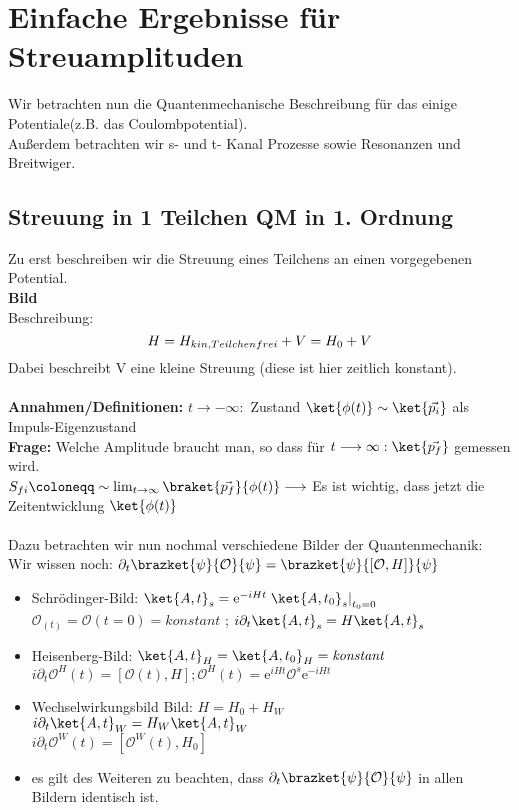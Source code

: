 \chapter{Einfache Ergebnisse für Streuamplituden}

Wir betrachten nun die Quantenmechanische Beschreibung für das einige 
Potentiale(z.B. das Coulombpotential). \\
Außerdem betrachten wir s- und t- Kanal Prozesse sowie Resonanzen und 
Breitwiger.  

\section{Streuung in 1 Teilchen QM in 1. Ordnung}

Zu erst beschreiben wir die Streuung eines Teilchens an einen vorgegebenen 
Potential. \\
\textbf{Bild} \\
Beschreibung: \[ H= H_{kin, Teilchenfrei} + V \\
= H_0 + V  \]
Dabei beschreibt V eine kleine Streuung (diese ist hier zeitlich konstant). \\
\\
\textbf{Annahmen/Definitionen:} $t \longrightarrow - \infty:$ Zustand 
$\ket{\phi(t)} \sim \ket{\vec{p_i}}$ als Impuls-Eigenzustand\\
\textbf{Frage:} Welche Amplitude braucht man, so dass für $t \longrightarrow 
\infty: \ket{\vec{p_f}}$ gemessen wird. \\
$S_{fi} \coloneqq \sim \lim_{t\to \infty} \braket{\vec{p_f}}{\phi(t)} 
\longrightarrow$ Es ist wichtig, dass jetzt die Zeitentwicklung $\ket{\phi(t)}$ 
\\
\\
Dazu betrachten wir nun nochmal verschiedene Bilder der Quantenmechanik: \\
Wir wissen noch: $\partial_t \brazket{\psi}{\mathcal{O}}{\psi} = 
\brazket{\psi}{ \left[ \mathcal{O},H \right] }{\psi}$
\begin{itemize}
	\item Schrödinger-Bild: $\ket{A,t}_s = \mathrm{e}^{-iHt} \left. 
	\ket{A,t_0}_s \right|_{t_0 = 0}$
	$\mathcal{O}_(t) = \mathcal{O}(t=0) = \mathit{konstant}$ ; $i\partial_t 
	\ket{A,t}_s = H \ket{A,t}_s$
	\item Heisenberg-Bild: $\ket{A,t}_H = \ket{A,t_0}_H = \mathit{konstant}$ \\
	$i\partial_t \mathcal{O}^H(t) = \left[ \mathcal{O}(t), H \right] ; 
	\mathcal{O}^H(t) = \mathrm{e}^{iHt} \mathcal{O}^s \mathrm{e}^{-iHt} $
	\item Wechselwirkungsbild Bild: $H=H_0 + H_W$ \\
	$i\partial_t \ket{A,t}_W = H_W \ket{A,t}_W $ \\
	$i\partial_t \mathcal{O}^W (t) = \left[ \mathcal{O}^W (t), H_0 \right]$ 
	\item es gilt des Weiteren zu beachten, dass $\partial_t 
	\brazket{\psi}{\mathcal{O}}{\psi}$ in allen Bildern identisch ist.
\end{itemize}


